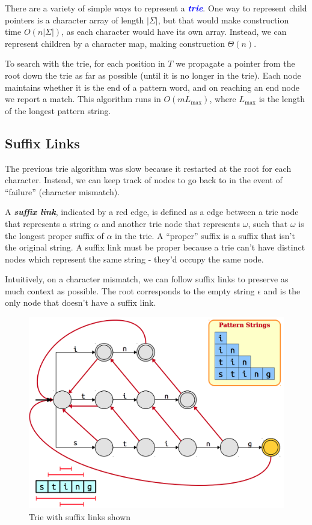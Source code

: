 \documentclass[11pt, oneside]{article}
\newcommand{\emphasis}[1]{\textcolor{blue}{\textbf{\textit{#1}}}}
\begin{document}
There are a variety of simple ways to represent a \emphasis{trie}.
One way to represent child pointers is a character array of length \( |\Sigma| \),
but that would make construction time \( O(n |\Sigma|) \), as each character would have its own array.
Instead, we can represent children by a character map, making construction \( \Theta(n) \).

To search with the trie, for each position in \( T \) we propagate a pointer from the root down the trie as far as possible (until it is no longer in the trie).
Each node maintains whether it is the end of a pattern word, and on reaching an end node we report a match.
This algorithm runs in \( O(m L_\text{max}) \), where \( L_\text{max} \) is the length of the longest pattern string.

\subsection{Suffix Links}

The previous trie algorithm was slow because it restarted at the root for each character.
Instead, we can keep track of nodes to go back to in the event of ``failure'' (character mismatch).

A \textbf{\textit{suffix link}}, indicated by a red edge, is defined as a edge between a trie node that represents a string \( \alpha \)
and another trie node that represents \( \omega \), such that \( \omega \)
is the longest proper suffix of \( \alpha \) in the trie. A ``proper'' suffix
is a suffix that isn't the original string. A suffix link must be proper because a trie can't have
distinct nodes which represent the same string - they'd occupy the same node.

Intuitively, on a character mismatch, we can follow suffix links to preserve as much context as possible.
The root corresponds to the empty string \( \epsilon \) and is the only node that doesn't have a suffix link.

\begin{figure}[h!]
\centering
\includegraphics[scale=0.25]{suffix}
\caption{Trie with suffix links shown}
\end{figure}
\end{document}
